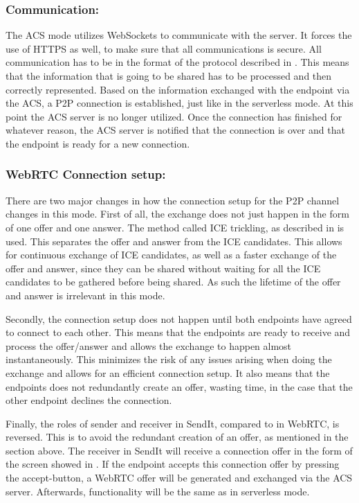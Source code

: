 \subsubsection*{Communication:}
The ACS mode utilizes WebSockets to communicate with the server. It forces the use of HTTPS as well, to make sure that all communications is secure. All communication has to be in the format of the protocol described in . This means that the information that is going to be shared has to be processed and then correctly represented. Based on the information exchanged with the endpoint via the ACS, a P2P connection is established, just like in the serverless mode. At this point the ACS server is no longer utilized. Once the connection has finished for whatever reason, the ACS server is notified that the connection is over and that the endpoint is ready for a new connection.
%
\subsubsection*{WebRTC Connection setup:}
There are two major changes in how the connection setup for the P2P channel changes in this mode. First of all, the exchange does not just happen in the form of one offer and one answer. The method called ICE trickling, as described in  is used. This separates the offer and answer from the ICE candidates. This allows for continuous exchange of ICE candidates, as well as a faster exchange of the offer and answer, since they can be shared without waiting for all the ICE candidates to be gathered before being shared. As such the lifetime of the offer and answer is irrelevant in this mode.

Secondly, the connection setup does not happen until both endpoints have agreed to connect to each other. This means that the endpoints are ready to receive and process the offer/answer and allows the exchange to happen almost instantaneously. This minimizes the risk of any issues arising when doing the exchange and allows for an efficient connection setup. It also means that the endpoints does not redundantly create an offer, wasting time, in the case that the other endpoint declines the connection.

Finally, the roles of sender and receiver in SendIt, compared to in WebRTC, is reversed. This is to avoid the redundant creation of an offer, as mentioned in the section above. The receiver in SendIt will receive a connection offer in the form of the screen showed in . If the endpoint accepts this connection offer by pressing the accept-button, a WebRTC offer will be generated and exchanged via the ACS server. Afterwards, functionality will be the same as in serverless mode.
%
